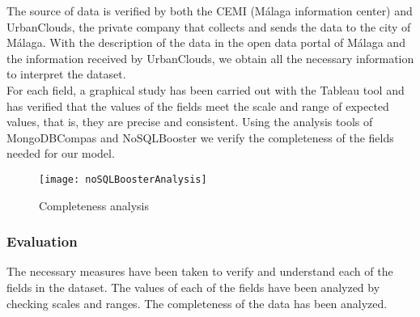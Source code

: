 The source of data is verified by both the CEMI (Málaga information center) and UrbanClouds, the private company
that collects and sends the data to the city of Málaga.
With the description of the data in the open data portal of Málaga and the information received by UrbanClouds,
we obtain all the necessary information to interpret the dataset. \\

For each field, a graphical study has been carried out with the Tableau tool and has verified that the values of the
fields meet the scale and range of expected values, that is, they are precise and consistent.
Using the analysis tools of MongoDBCompas and NoSQLBooster we verify the completeness of the fields needed for our model.

\begin{figure}[ht]
    \centering
    \texttt{[image: noSQLBoosterAnalysis]}
    \caption{Completeness analysis}
\end{figure}

\subsubsection*{Evaluation}  

\begin{itemize}
    \done The necessary measures have been taken to verify and understand each of the fields in the dataset.
    \done The values of each of the fields have been analyzed by checking scales and ranges.
    \done The completeness of the data has been analyzed.
\end{itemize}